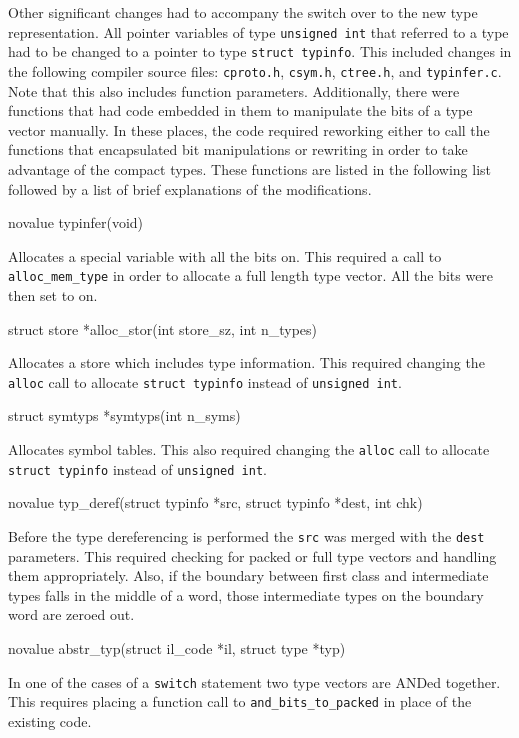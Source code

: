 Other significant changes had to accompany the switch over to the new
type representation. All pointer variables of type \texttt{unsigned
int} that referred to a type had to be changed to a pointer to type
\texttt{struct typinfo}. This included changes in the following
compiler source files: \texttt{cproto.h}, \texttt{csym.h},
\texttt{ctree.h}, and \texttt{typinfer.c}. Note that this also
includes function parameters. Additionally, there were functions that
had code embedded in them to manipulate the bits of a type vector
manually. In these places, the code required reworking either to
call the functions that encapsulated bit manipulations or rewriting in
order to take advantage of the compact types. These functions are
listed in the following list followed by a list of brief explanations
of the modifications.

{\ttfamily\mdseries
novalue typinfer(void)}

Allocates a special variable with all the bits on. This required a
call to \texttt{alloc\_mem\_type} in order to allocate a full length
type vector. All the bits were then set to on.

{\ttfamily\mdseries
struct store *alloc\_stor(int store\_sz, int n\_types)}

Allocates a store which includes type information. This required
changing the \texttt{alloc} call to allocate \texttt{struct typinfo}
instead of \texttt{unsigned int}.

{\ttfamily\mdseries
struct symtyps *symtyps(int n\_syms)}


Allocates symbol tables. This also required changing the
\texttt{alloc} call to allocate \texttt{struct typinfo} instead of
\texttt{unsigned int}.

{\ttfamily\mdseries
novalue typ\_deref(struct typinfo *src, struct typinfo *dest, int chk)}


Before the type dereferencing is performed the \texttt{src} was merged
with the \texttt{dest} parameters. This required checking for packed
or full type vectors and handling them appropriately. Also, if the
boundary between first class and intermediate types falls in the
middle of a word, those intermediate types on the boundary word are
zeroed out.

{\ttfamily\mdseries
novalue abstr\_typ(struct il\_code *il, struct type *typ)}


In one of the cases of a \texttt{switch} statement two type vectors
are ANDed together. This requires placing a function call to
\texttt{and\_bits\_to\_packed} in place of the existing code.

